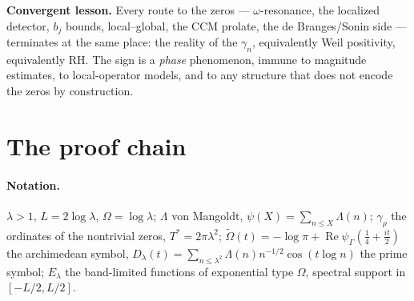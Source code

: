 \documentclass[11pt]{article}
\theoremstyle{remark}
\newcommand{\Om}{\widetilde{\Omega}}
\begin{document}
\noindent\textbf{Convergent lesson.} Every route to the zeros --- $\omega$-resonance, the
localized detector, $b_j$ bounds, local--global, the CCM prolate, the de Branges/Sonin side ---
terminates at the same place: the reality of the $\gamma_n$, equivalently Weil positivity,
equivalently RH. The sign is a \emph{phase} phenomenon, immune to magnitude estimates, to
local-operator models, and to any structure that does not encode the zeros by construction.

\section{The proof chain}

\paragraph{Notation.} $\lambda>1$, $L=2\log\lambda$, $\Omega=\log\lambda$; $\Lambda$ von
Mangoldt, $\psi(X)=\sum_{n\le X}\Lambda(n)$; $\gamma_\rho$ the ordinates of the nontrivial
zeros, $T^*=2\pi\lambda^2$; $\Om(t)=-\log\pi+\operatorname{Re}\psi_\Gamma(\tfrac14+\tfrac{it}2)$
the archimedean symbol, $D_\lambda(t)=\sum_{n\le\lambda^2}\Lambda(n)n^{-1/2}\cos(t\log n)$ the
prime symbol; $E_\lambda$ the band-limited functions of exponential type $\Omega$, spectral
support in $[-L/2,L/2]$.
\end{document}
